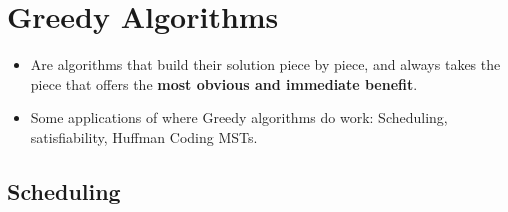 \section{Greedy Algorithms}

	\begin{itemize}
		\item Are algorithms that build their solution piece by piece, and always takes the piece that 
			offers the \textbf{most obvious and immediate benefit}.
		\item Some applications of where Greedy algorithms do work: Scheduling, satisfiability, Huffman Coding
			MSTs. 
	\end{itemize}
	\subsection{Scheduling}
